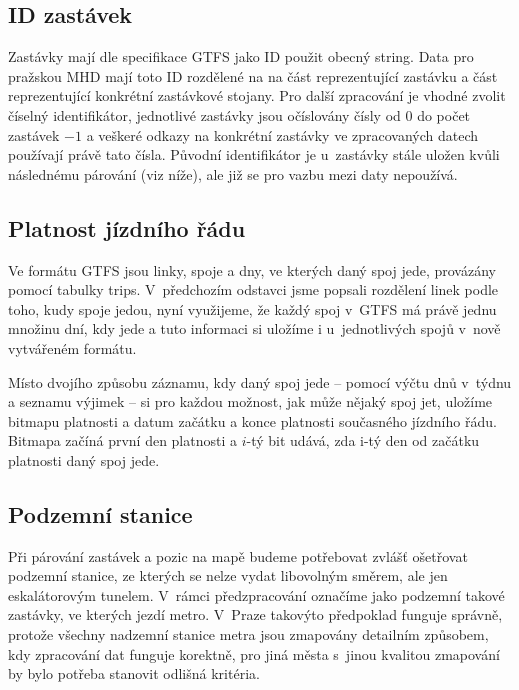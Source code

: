 \subsection{ID zastávek}
Zastávky mají dle specifikace GTFS jako ID použit obecný string. Data pro
pražskou MHD mají toto ID rozdělené na na část reprezentující zastávku a část
reprezentující konkrétní zastávkové stojany. Pro další zpracování je vhodné
zvolit číselný identifikátor, jednotlivé zastávky jsou očíslovány čísly od 0 do
počet zastávek $- 1$ a veškeré odkazy na konkrétní zastávky ve zpracovaných datech
používají právě tato čísla. Původní identifikátor je u~zastávky stále uložen
kvůli následnému párování (viz níže), ale již se pro vazbu mezi daty nepoužívá.

\subsection{Platnost jízdního řádu}
Ve formátu GTFS jsou linky, spoje a dny, ve kterých daný spoj jede, provázány
pomocí tabulky trips. V~předchozím odstavci jsme popsali rozdělení linek podle
toho, kudy spoje jedou, nyní využijeme, že každý spoj v~GTFS má právě jednu
množinu dní, kdy jede a tuto informaci si uložíme i u~jednotlivých spojů v~nově
vytvářeném formátu.

Místo dvojího způsobu záznamu, kdy daný spoj jede -- pomocí výčtu dnů v~týdnu a
seznamu výjimek -- si pro každou možnost, jak může nějaký spoj jet, uložíme
bitmapu platnosti a datum začátku a konce platnosti současného jízdního řádu. 
Bitmapa začíná první den platnosti a $i$-tý bit udává, zda i-tý den od začátku
platnosti daný spoj jede.  

\subsection{Podzemní stanice}
Při párování zastávek a pozic na mapě budeme potřebovat zvlášť ošetřovat
podzemní stanice, ze kterých se nelze vydat libovolným směrem, ale jen
eskalátorovým tunelem. V~rámci předzpracování označíme jako podzemní takové
zastávky, ve kterých jezdí metro. V~Praze takovýto předpoklad funguje správně,
protože všechny nadzemní stanice metra jsou zmapovány detailním způsobem, kdy
zpracování dat funguje korektně, pro jiná města s~jinou kvalitou zmapování by
bylo potřeba stanovit odlišná kritéria.


